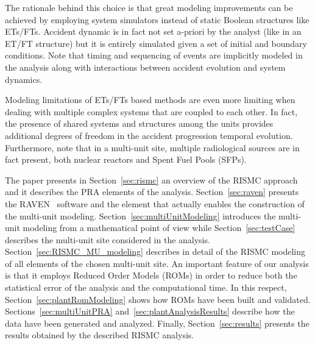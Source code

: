 The rationale behind this choice is that great modeling improvements can be achieved by 
employing system simulators instead of static Boolean structures like ETs/FTs. 
Accident dynamic is in fact not set a-priori by the analyst (like in an ET/FT 
structure) but it is entirely simulated given a set of initial and boundary conditions. 
Note that timing and sequencing of events are implicitly modeled in the analysis along 
with interactions between accident evolution and system dynamics.

Modeling limitations of ETs/FTs based methods are even more limiting when dealing with 
multiple complex systems that are coupled to each other. In fact, the presence of shared 
systems and structures among the units provides additional degrees of freedom in the 
accident progression temporal evolution.
Furthermore, note that in a multi-unit site, multiple radiological sources are in fact present, 
both nuclear reactors and Spent Fuel Pools (SFPs). 

The paper presents in Section~\ref{sec:rismc} an overview of the RISMC approach and it describes
the PRA elements of the analysis. Section~\ref{sec:raven} presents the RAVEN~\cite{RAVEN_PSAM_2014} 
software and the element that actually enables the construction of the multi-unit modeling. 
Section~\ref{sec:multiUnitModeling} introduces the multi-unit modeling from a mathematical 
point of view while Section~\ref{sec:testCase} describes the multi-unit site considered in the
analysis.
Section~\ref{sec:RISMC_MU_modeling} describes in detail of the RISMC modeling of all elements 
of the chosen multi-unit site.
An important feature of our analysis is that it employs Reduced Order Models (ROMs) in order to
reduce both the statistical error of the analysis and the computational time. In this respect,
Section~\ref{sec:plantRomModeling} shows how ROMs have been built and validated.
Sections~\ref{sec:multiUnitPRA} and~\ref{sec:plantAnalysisResults} describe how the data have been 
generated and analyzed.
Finally, Section~\ref{sec:results} presents the results obtained by the described RISMC analysis.
 



